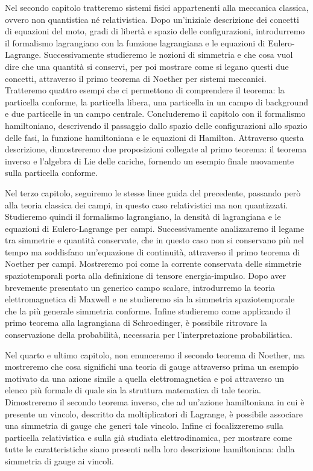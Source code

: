     Nel secondo capitolo tratteremo sistemi fisici appartenenti alla meccanica classica, ovvero non quantistica né relativistica. Dopo un'iniziale descrizione dei concetti di equazioni del moto, gradi di libertà e spazio delle configurazioni, introdurremo il formalismo lagrangiano con la funzione lagrangiana e le equazioni di Eulero-Lagrange. Successivamente studieremo le nozioni di simmetria e che cosa vuol dire che una quantità si conservi, per poi mostrare come si legano questi due concetti, attraverso il primo teorema di Noether per sistemi meccanici. Tratteremo quattro esempi che ci permettono di comprendere il teorema: la particella conforme, la particella libera, una particella in un campo di background e due particelle in un campo centrale. Concluderemo il capitolo con il formalismo hamiltoniano, descrivendo il passaggio dallo spazio delle configurazioni allo spazio delle fasi, la funzione hamiltoniana e le equazioni di Hamilton. Attraverso questa descrizione, dimostreremo due proposizioni collegate al primo teorema: il teorema inverso e l'algebra di Lie delle cariche, fornendo un esempio finale nuovamente sulla particella conforme.

    Nel terzo capitolo, seguiremo le stesse linee guida del precedente, passando però alla teoria classica dei campi, in questo caso relativistici ma non quantizzati. Studieremo quindi il formalismo lagrangiano, la densità di lagrangiana e le equazioni di Eulero-Lagrange per campi. Successivamente analizzaremo il legame tra simmetrie e quantità conservate, che in questo caso non si conservano più nel tempo ma soddisfano un'equazione di continuità, attraverso il primo teorema di Noether per campi. Mostreremo poi come la corrente conservata delle simmetrie spaziotemporali porta alla definizione di tensore energia-impulso. Dopo aver brevemente presentato un generico campo scalare, introdurremo la teoria elettromagnetica di Maxwell e ne studieremo sia la simmetria spaziotemporale che la più generale simmetria conforme. Infine studieremo come applicando il primo teorema alla lagrangiana di Schroedinger, è possibile ritrovare la conservazione della probabilità, necessaria per l'interpretazione probabilistica.

    Nel quarto e ultimo capitolo, non enunceremo il secondo teorema di Noether, ma mostreremo che cosa significhi una teoria di gauge attraverso prima un esempio motivato da una azione simile a quella elettromagnetica e poi attraverso un elenco più formale di quale sia la struttura matematica di tale teoria. Dimostreremo il secondo teorema inverso, che ad un'azione hamiltoniana in cui è presente un vincolo, descritto da moltiplicatori di Lagrange, è possibile associare una simmetria di gauge che generi tale vincolo. Infine ci focalizzeremo sulla particella relativistica e sulla già studiata elettrodinamica, per mostrare come tutte le caratteristiche siano presenti nella loro descrizione hamiltoniana: dalla simmetria di gauge ai vincoli. 

